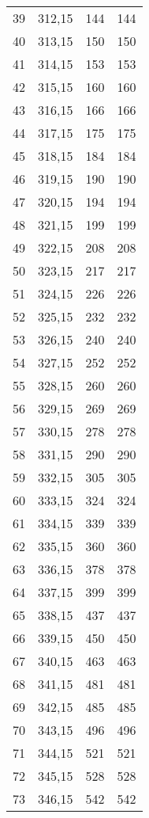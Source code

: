 \begin{longtable}{c  c  c  c}
      39  & 312,15 & 144 & 144  \\
      40  & 313,15 & 150 & 150  \\
      41  & 314,15 & 153 & 153  \\
      42  & 315,15 & 160 & 160  \\
      43  & 316,15 & 166 & 166  \\
      44  & 317,15 & 175 & 175  \\
      45  & 318,15 & 184 & 184  \\
      46  & 319,15 & 190 & 190  \\
      47  & 320,15 & 194 & 194  \\
      48  & 321,15 & 199 & 199  \\
      49  & 322,15 & 208 & 208  \\
      50  & 323,15 & 217 & 217  \\
      51  & 324,15 & 226 & 226  \\
      52  & 325,15 & 232 & 232  \\
      53  & 326,15 & 240 & 240  \\
      54  & 327,15 & 252 & 252  \\
      55  & 328,15 & 260 & 260  \\
      56  & 329,15 & 269 & 269  \\
      57  & 330,15 & 278 & 278  \\
      58  & 331,15 & 290 & 290  \\
      59  & 332,15 & 305 & 305  \\
      60  & 333,15 & 324 & 324  \\
      61  & 334,15 & 339 & 339  \\
      62  & 335,15 & 360 & 360  \\
      63  & 336,15 & 378 & 378  \\
      64  & 337,15 & 399 & 399  \\
      65  & 338,15 & 437 & 437  \\
      66  & 339,15 & 450 & 450  \\
      67  & 340,15 & 463 & 463  \\
      68  & 341,15 & 481 & 481  \\
      69  & 342,15 & 485 & 485  \\
      70  & 343,15 & 496 & 496  \\
      71  & 344,15 & 521 & 521  \\
      72  & 345,15 & 528 & 528  \\
      73  & 346,15 & 542 & 542  \\

\end{longtable}
